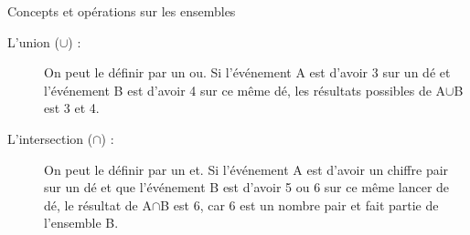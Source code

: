 \documentclass[10pt, french]{article}
\begin{document}
\begin{multicols*}{3}
\begin{probch2}{Concepts et opérations sur les ensembles}
\begin{description}
  \item[L'union ({$\displaystyle \cup$}) :] On peut le définir par un ou. Si l'événement A est d'avoir 3 sur un dé et l'événement B est d'avoir 4 sur ce même dé, les résultats possibles de A{$\displaystyle \cup$}B est 3 et 4.
  \item[L'intersection ({$\displaystyle \cap$}) :] On peut le définir par un et. Si l'événement A est d'avoir un chiffre pair sur un dé et que l'événement B est d'avoir 5 ou 6 sur ce même lancer de dé, le résultat de A{$\displaystyle \cap$}B est 6, car 6 est un nombre pair et fait partie de l'ensemble B.
\end{description}
\end{probch2}

\pagebreak

\end{multicols*}
\end{document}
